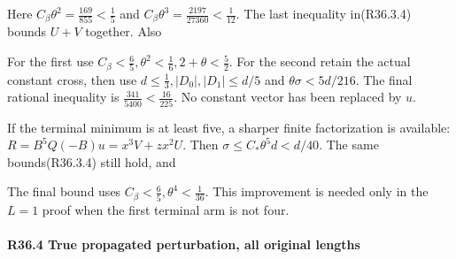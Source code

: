 


Here \(C_\beta \theta^2=\frac{169}{855}<\frac{1}{5}\) and \(C_\beta \theta^3=\frac{2197}{27360}<\frac{1}{12}\). The last inequality in(R36.3.4) bounds \(U+V\) together. Also


For the first use \(C_\beta<\frac{6}{5},\allowbreak \allowbreak \theta^2<\frac{1}{6},\allowbreak \allowbreak 2+\theta<\frac{5}{2}\). For the second retain the actual constant cross, then use \(d\le \frac{1}{3},\allowbreak \allowbreak  \lvert D_0\rvert ,\allowbreak \allowbreak \lvert D_1\rvert \le d/5\) and \(\theta \sigma<5d/216\). The final rational inequality is \(\frac{341}{5400}<\frac{16}{225}\). No constant vector has been replaced by \(u\).

If the terminal minimum is at least five, a sharper finite factorization is available: \(R=B^5 Q(-B)u=x^3V+z x^2U\). Then \(\sigma\le C_*\theta^5d<d/40\). The same bounds(R36.3.4) still hold, and


The final bound uses \(C_\beta<\frac{6}{5},\allowbreak \allowbreak \theta^4<\frac{1}{36}\). This improvement is needed only in the \(L=1\) proof when the first terminal arm is not four.

\paragraph{R36.4 True propagated perturbation, all original lengths}

